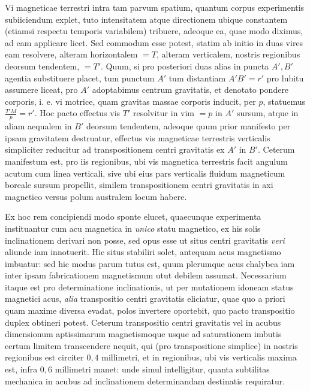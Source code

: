 Vi magneticae terrestri intra tam parvum spatium, quantum corpus experimentis subiiciendum explet, tuto intensitatem atque directionem ubique constantem (etiamsi respectu temporis variabilem) tribuere, adeoque ea, quae modo diximus, ad eam applicare licet. Sed commodum esse potest, statim ab initio in duas vires eam resolvere, alteram horizontalem $=T$, alteram verticalem, nostris regionibus deorsum tendentem, $=T'$. Quum, si pro posteriori duas alias in puncta $A',B'$ agentia substituere placet, tum punctum $A'$ tum distantiam $A'B'=r'$ pro lubitu assumere liceat, pro $A'$ adoptabimus centrum gravitatis, et denotato pondere corporis, i. e. vi motrice, quam gravitas massae corporis inducit, per $p$, statuemus $\frac{T'M}{p}=r'$. Hoc pacto effectus vis $T'$ resolvitur in vim $=p$ in $A'$ sursum, atque in aliam aequalem in $B'$ deorsum tendentem, adeoque quum prior manifesto per ipsam gravitatem destruatur, effectus vis magneticae terrestris verticalis simpliciter reducitur ad transpositionem centri gravitatis ex $A'$ in $B'$. Ceterum manifestum est, pro iis regionibus, ubi vis magnetica terrestris facit angulum acutum cum linea verticali, sive ubi eius pars verticalis fluidum magneticum boreale sursum propellit, similem transpositionem centri gravitatis in axi magnetico versus polum australem locum habere.

Ex hoc rem concipiendi modo sponte elucet, quaecunque experimenta instituantur cum acu magnetica in \textit{unico} statu magnetico, ex his solis inclinationem derivari non posse, sed opus esse ut situs centri gravitatis \textit{veri} aliunde iam innotuerit. Hic situs stabiliri solet, antequam acus magnetismo imbuatur: sed hic modus parum tutus est, quum plerumque acus chalybea iam inter ipsam fabricationem magnetismum utut debilem assumat. Necessarium itaque est pro determinatione inclinationis, ut per mutationem idoneam status magnetici acus, \textit{alia} transpositio centri gravitatis eliciatur, quae quo a priori quam maxime diversa evadat, polos invertere oportebit, quo pacto transpositio duplex obtineri potest. Ceterum transpositio centri gravitatis vel in acubus dimensionum aptissimarum magnetismoque usque ad saturationem imbutis certum limitem transcendere nequit, qui (pro transpositione simplice) in nostris regionibus est circiter $0{,}4$ millimetri, et in regionibus, ubi vis verticalis maxima est, infra $0{,}6$ millimetri manet: unde simul intelligitur, quanta subtilitas mechanica in acubus ad inclinationem determinandam destinatis requiratur.

